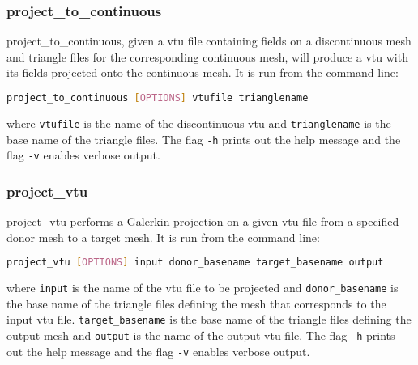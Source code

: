 
\subsubsection{project\_to\_continuous}
\label{sec:project_to_continuous}
project\_to\_continuous, given a vtu file containing fields on a discontinuous mesh and triangle files for the corresponding continuous mesh, will produce a vtu with its fields projected onto the continuous mesh. It is run from the command line:

\begin{lstlisting}[language = Bash]
project_to_continuous [OPTIONS] vtufile trianglename
\end{lstlisting}

where \lstinline[language = Bash]+vtufile+ is the name of the discontinuous vtu and \lstinline[language = Bash]+trianglename+ is the base name of the triangle files. The flag \lstinline[language = Bash]+-h+ prints out the help message and the flag \lstinline[language = Bash]+-v+ enables verbose output.



\subsubsection{project\_vtu}
\label{sec:project_vtu}
project\_vtu performs a Galerkin projection on a given vtu file from a specified donor mesh to a target mesh. It is run from the command line:

\begin{lstlisting}[language = Bash]
project_vtu [OPTIONS] input donor_basename target_basename output
\end{lstlisting}

where \lstinline[language = Bash]+input+ is the name of the vtu file to be projected and \lstinline[language = Bash]+donor_basename+ is the base name of the triangle files defining the mesh that corresponds to the input vtu file. 
\lstinline[language = Bash]+target_basename+ is the base name of the triangle files defining the output mesh and \lstinline[language = Bash]+output+ is the name of the output vtu file.
The flag \lstinline[language = Bash]+-h+ prints out the help message and the flag \lstinline[language = Bash]+-v+ enables verbose output.



